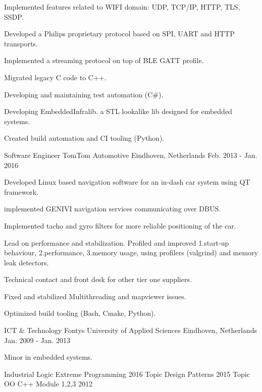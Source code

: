 \begin{cventries}
{\begin{cvitems}
        \item {Implemented features related to WIFI domain: UDP, TCP/IP, HTTP, TLS, SSDP.}
        \item {Developed a Philips proprietary protocol based on SPI, UART and HTTP transports.}
        \item {Implemented a streaming protocol on top of BLE GATT profile.}
        \item {Migrated legacy C code to C++.}
        \item {Developing and maintaining test automation (C\#).}
        \item {Developing EmbeddedInfralib. a STL lookalike lib designed for embedded systems.}
        \item {Created build automation and CI tooling (Python).}
      \end{cvitems}
    }
  \cventry
    {Software Engineer}
    {TomTom Automotive}
    {Eindhoven, Netherlands}
    {Feb. 2013 - Jan. 2016}
    {
      \begin{cvitems}
        \item {Developed Linux based navigation software for an in-dash car system using QT framework.}
        \item{implemented GENIVI navigation services communicating over DBUS.}
        \item {Implemented tacho and gyro filters for more reliable positioning of the car. }
        \item {Lead on performance and stabilization. Profiled and improved 1.start-up behaviour, 2.performance, 3.memory usage, using profilers (valgrind) and memory leak detectors.}
        \item {Technical contact and front desk for other tier one suppliers.}
        \item {Fixed and stabilized Multithreading and mapviewer issues.}
        \item {Optimized build tooling (Bash, Cmake, Python).}
      \end{cvitems}
    }
\end{cventries}
\newpage


\begin{cventries}
  \cventry
    {ICT \& Technology}
    {Fontys University of Applied Sciences}
    {Eindhoven, Netherlands}
    {Jan. 2009 - Jan. 2013}
    {
      \begin{cvitems}
        \item {Minor in embedded systems.}
      \end{cvitems}
    }
\end{cventries}
\begin{cventries}
  \cventry
    {Industrial Logic}
    {Extreme Programming}
    {}
    {2016}
    {}
      \cventry
    {Topic}
    {Design Patterns}
    {}
    {2015}
    {}
      \cventry
    {Topic}
    {OO C++ Module 1,2,3}
    {}
    {2012}
    {}
\end{cventries}

